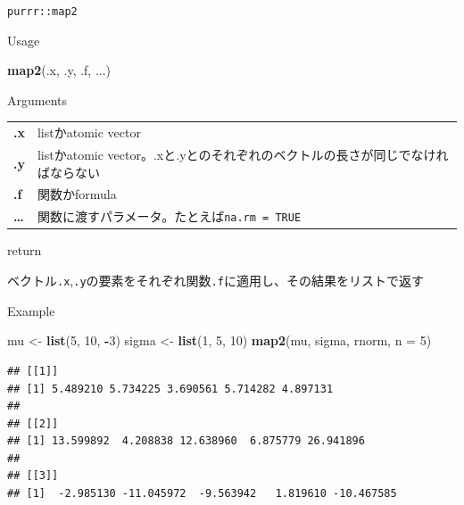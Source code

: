 \documentclass[ignorenonframetext,]{beamer}
\newenvironment{Shaded}{\begin{snugshade}}{\end{snugshade}}
\newcommand{\KeywordTok}[1]{\textcolor[rgb]{0.13,0.29,0.53}{\textbf{#1}}}
\newcommand{\DataTypeTok}[1]{\textcolor[rgb]{0.13,0.29,0.53}{#1}}
\newcommand{\DecValTok}[1]{\textcolor[rgb]{0.00,0.00,0.81}{#1}}
\newcommand{\StringTok}[1]{\textcolor[rgb]{0.31,0.60,0.02}{#1}}
\newcommand{\OperatorTok}[1]{\textcolor[rgb]{0.81,0.36,0.00}{\textbf{#1}}}
\newcommand{\NormalTok}[1]{#1}
\begin{document}
\begin{frame}[fragile]{\texttt{purrr::map2}}

\begin{block}{Usage}

\begin{Shaded}
\begin{Highlighting}[]
\KeywordTok{map2}\NormalTok{(.x, .y, .f, ...)}
\end{Highlighting}
\end{Shaded}

\end{block}

\begin{block}{Arguments}

\begin{longtable}[]{@{}ll@{}}
\toprule
\textbf{.x} & listかatomic vector\tabularnewline
\textbf{.y} & listかatomic
vector。.xと.yとのそれぞれのベクトルの長さが同じでなければならない\tabularnewline
\textbf{.f} & 関数かformula\tabularnewline
\textbf{\ldots{}} &
関数に渡すパラメータ。たとえば\texttt{na.rm\ =\ TRUE}\tabularnewline
\bottomrule
\end{longtable}

\end{block}

\begin{block}{return}

ベクトル\texttt{.x},\texttt{.y}の要素をそれぞれ関数\texttt{.f}に適用し、その結果をリストで返す

\end{block}

\end{frame}

\begin{frame}[fragile]{Example}

\begin{Shaded}
\begin{Highlighting}[]
\NormalTok{mu <-}\StringTok{ }\KeywordTok{list}\NormalTok{(}\DecValTok{5}\NormalTok{, }\DecValTok{10}\NormalTok{, }\OperatorTok{-}\DecValTok{3}\NormalTok{)}
\NormalTok{sigma <-}\StringTok{ }\KeywordTok{list}\NormalTok{(}\DecValTok{1}\NormalTok{, }\DecValTok{5}\NormalTok{, }\DecValTok{10}\NormalTok{)}
\KeywordTok{map2}\NormalTok{(mu, sigma, rnorm, }\DataTypeTok{n =} \DecValTok{5}\NormalTok{)}
\end{Highlighting}
\end{Shaded}

\begin{verbatim}
## [[1]]
## [1] 5.489210 5.734225 3.690561 5.714282 4.897131
## 
## [[2]]
## [1] 13.599892  4.208838 12.638960  6.875779 26.941896
## 
## [[3]]
## [1]  -2.985130 -11.045972  -9.563942   1.819610 -10.467585
\end{verbatim}

\end{frame}
\end{document}
